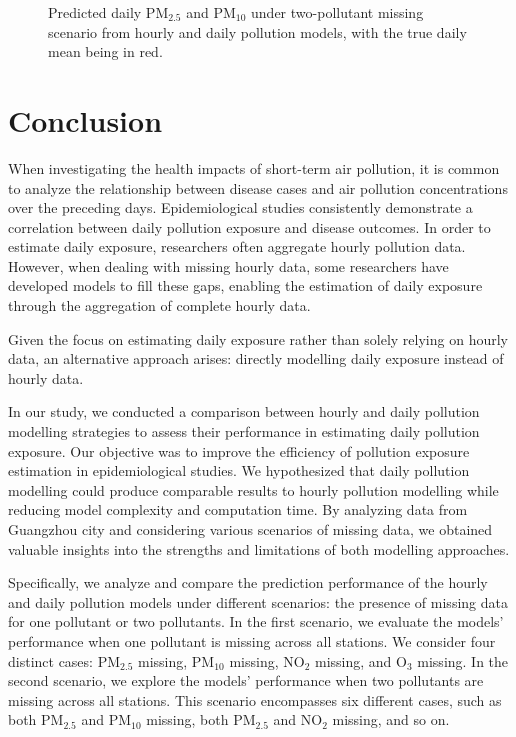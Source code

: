 \documentclass[
  12,
]{article}
\begin{document}
\begin{figure}[H]
\caption{Predicted daily PM$_{2.5}$ and PM$_{10}$ under two-pollutant missing scenario from hourly and daily pollution models, with the true daily mean being in red.}\label{fig:pm25pm10missing}
\end{figure}

\hypertarget{conclusion}{%
\section{Conclusion}\label{conclusion}}

When investigating the health impacts of short-term air pollution, it is
common to analyze the relationship between disease cases and air
pollution concentrations over the preceding days. Epidemiological
studies consistently demonstrate a correlation between daily pollution
exposure and disease outcomes. In order to estimate daily exposure,
researchers often aggregate hourly pollution data. However, when dealing
with missing hourly data, some researchers have developed models to fill
these gaps, enabling the estimation of daily exposure through the
aggregation of complete hourly data.

Given the focus on estimating daily exposure rather than solely relying
on hourly data, an alternative approach arises: directly modelling daily
exposure instead of hourly data.

In our study, we conducted a comparison between hourly and daily
pollution modelling strategies to assess their performance in estimating
daily pollution exposure. Our objective was to improve the efficiency of
pollution exposure estimation in epidemiological studies. We
hypothesized that daily pollution modelling could produce comparable
results to hourly pollution modelling while reducing model complexity
and computation time. By analyzing data from Guangzhou city and
considering various scenarios of missing data, we obtained valuable
insights into the strengths and limitations of both modelling
approaches.

Specifically, we analyze and compare the prediction performance of the
hourly and daily pollution models under different scenarios: the
presence of missing data for one pollutant or two pollutants. In the
first scenario, we evaluate the models' performance when one pollutant
is missing across all stations. We consider four distinct cases:
PM\(_{2.5}\) missing, PM\(_{10}\) missing, NO\(_2\) missing, and O\(_3\)
missing. In the second scenario, we explore the models' performance when
two pollutants are missing across all stations. This scenario
encompasses six different cases, such as both PM\(_{2.5}\) and
PM\(_{10}\) missing, both PM\(_{2.5}\) and NO\(_2\) missing, and so on.
\end{document}
